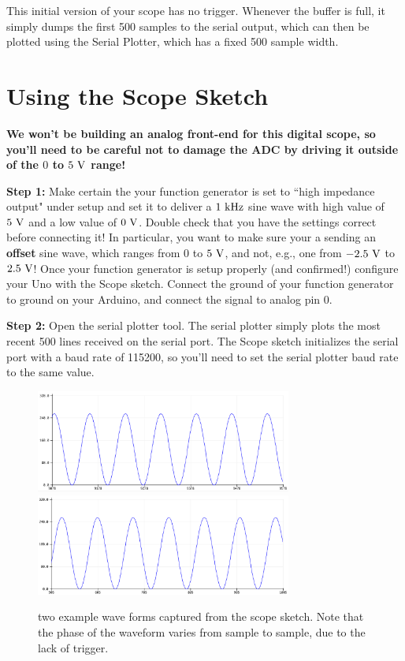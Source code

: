 \documentclass[12pt]{article}
\begin{document}
This initial version of your scope has no trigger.  Whenever the buffer is full, it simply dumps the first 500 samples to the serial output, which can then be plotted using the Serial Plotter, which has a fixed 500 sample width.

\section{Using the Scope Sketch}

{\bf We won't be building an analog front-end for this digital scope, so you'll need to be careful not to damage the ADC by driving it outside of the $0$ to $5~\rm{V}$ range!}

\noindent
{\bf Step 1:}  Make certain the your function generator is set to ``high impedance output" under setup and set it to deliver a $1~\rm kHz$ sine wave with high value of $5~\rm V$ and a low value of $0~\rm V$.  Double check that you have the settings correct before connecting it!  In particular, you want to make sure your a sending an {\bf offset} sine wave, which ranges from $0$ to $5~\rm V$, and not, e.g., one from $-2.5~\rm V$ to $2.5~\rm V$!   Once your function generator is setup properly (and confirmed!) configure your Uno with the Scope sketch.  Connect the ground of your function generator to ground on your Arduino, and connect the signal to analog pin 0.

{\bf Step 2:}  Open the serial plotter tool.  The serial plotter simply plots the most recent 500 lines received on the serial port.  The Scope sketch initializes the serial port with a baud rate of 115200, so you'll need to set the serial plotter baud rate to the same value.

\begin{figure}[htbp]
\begin{center}
{\includegraphics[width=0.75\textwidth]{figs/tracea.png}}
{\includegraphics[width=0.75\textwidth]{figs/traceb.png}}
\end{center}
\caption{\label{fig:traces} two example wave forms captured from the {\rm scope}  sketch.  Note that the phase of the waveform varies from sample to sample, due to the lack of trigger.}
\end{figure}
\end{document}
